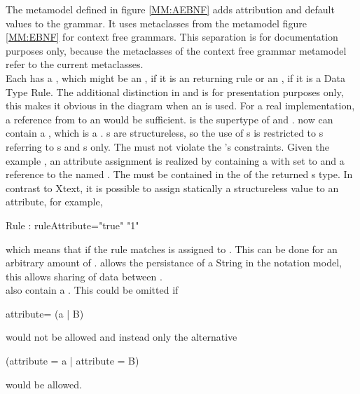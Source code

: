 The metamodel defined in figure \ref{MM:AEBNF} adds attribution and default values to the grammar. It uses metaclasses from the metamodel figure \ref{MM:EBNF} for context free grammars. This separation is for documentation purposes only, because the metaclasses of the context free grammar metamodel refer to the current metaclasses. \\
Each  has a , which might be an , if it is an  returning rule or an , if it is a Data Type Rule. The additional distinction in  and  is for presentation purposes only, this makes it obvious in the diagram when an  is used. For a real implementation, a reference from  to an  would be sufficient.  is the supertype of  and .  now can contain a  , which is a .  s are structureless, so the use of s is restricted to  s referring to s and  s only. The  must not violate the 's constraints. Given the example , an attribute assignment is realized by  containing a   with  set to   and a reference to the   named . The  must be contained in the   of the returned s type. In contrast to Xtext, it is possible to assign statically a structureless value to an attribute, for example, 
\begin{xtxt}
Rule : {ruleAttribute="true"} "1"
\end{xtxt}   
which means that if the rule matches  is assigned to . This can be done for an arbitrary amount of .  allows the persistance of a String in the notation model, this allows sharing of data between . \\
 also contain a . This could be omitted if 
\begin{xtxt}
attribute= (a | B)
\end{xtxt}
would not be allowed and instead only the alternative 
\begin{xtxt}
(attribute = a | attribute = B)
\end{xtxt}
would be allowed.
